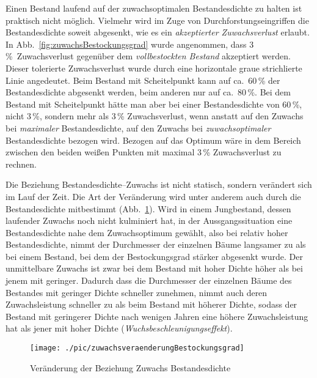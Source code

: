\documentclass[twocolumn]{scrartcl}
\begin{document}
Einen Bestand laufend auf der zuwachsoptimalen Bestandesdichte zu halten ist
praktisch nicht möglich. Vielmehr wird im Zuge von Durchforstungseingriffen die
Bestandesdichte soweit abgesenkt, wie es ein \emph{akzeptierter Zuwachsverlust}
erlaubt. In Abb.~\ref{fig:zuwachsBestockungsgrad} wurde angenommen, dass
3\,\%~Zuwachsverlust gegenüber dem \emph{vollbestockten Bestand} akzeptiert
werden. Dieser tolerierte Zuwachsverlust wurde durch eine horizontale graue
strichlierte Linie angedeutet. Beim Bestand mit Scheitelpunkt kann auf ca.\
60\,\% der Bestandesdichte abgesenkt werden, beim anderen nur auf ca.\ 80\,\%.
Bei dem Bestand mit Scheitelpunkt hätte man aber bei einer Bestandesdichte von
60\,\%, nicht 3\,\%, sondern mehr als 3\,\% Zuwachsverlust, wenn anstatt auf den
Zuwachs bei \emph{maximaler} Bestandesdichte, auf den Zuwachs bei
\emph{zuwachsoptimaler} Bestandesdichte bezogen wird. Bezogen auf das Optimum
wäre in dem Bereich zwischen den beiden weißen Punkten mit maximal 3\,\%
Zuwachsverlust zu rechnen.

Die Beziehung Bestandesdichte--Zuwachs ist nicht statisch, sondern verändert
sich im Lauf der Zeit. Die Art der Veränderung wird unter anderem auch durch die
Bestandesdichte mitbestimmt (Abb.~\ref{fig:zuwachsveraenderungBestockungsgrad}).
Wird in einem Jungbestand, dessen laufender Zuwachs noch nicht kulminiert hat,
in der Aussgangssituation eine Bestandesdichte nahe dem Zuwachsoptimum gewählt,
also bei relativ hoher Bestandesdichte, nimmt der Durchmesser der einzelnen
Bäume langsamer zu als bei einem Bestand, bei dem der Bestockungsgrad stärker
abgesenkt wurde. Der unmittelbare Zuwachs ist zwar bei dem Bestand mit hoher
Dichte höher als bei jenem mit geringer. Dadurch dass die Durchmesser der
einzelnen Bäume des Bestandes mit geringer Dichte schneller zunehmen, nimmt auch
deren Zuwachsleistung schneller zu als beim Bestand mit höherer Dichte, sodass
der Bestand mit geringerer Dichte nach wenigen Jahren eine höhere
Zuwachsleistung hat als jener mit hoher Dichte
(\emph{Wuchsbeschleunigungseffekt}).

\begin{figure}[htbp]
  \centering
  \texttt{[image: ./pic/zuwachsveraenderungBestockungsgrad]}
  \caption{Veränderung der Beziehung Zuwachs Bestandesdichte}
  \label{fig:zuwachsveraenderungBestockungsgrad}
\end{figure}
\end{document}
